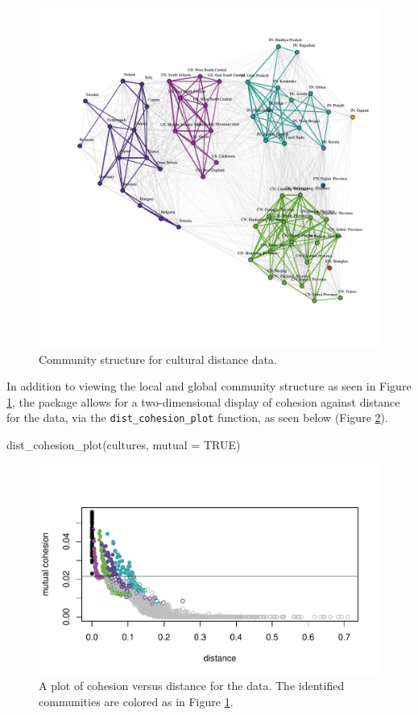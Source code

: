 \begin{Schunk}
\begin{figure}
\includegraphics[width=1\linewidth]{fig7} \caption[Community structure for cultural distance data]{Community structure for cultural distance data.}\label{fig:figculture}
\end{figure}
\end{Schunk}

In addition to viewing the local and global community structure as seen
in Figure \ref{fig:figculture}, the  package allows for a
two-dimensional display of cohesion against distance for the data, via
the \texttt{dist\_cohesion\_plot} function, as seen below (Figure
\ref{fig:figco}).

\begin{Schunk}
\begin{Sinput}
dist_cohesion_plot(cultures, mutual = TRUE)
\end{Sinput}
\begin{figure}
\includegraphics{dagostino-mcgowan_files/figure-latex/figco-1} \caption{A plot of cohesion versus distance for the data. The identified communities are colored as in Figure \ref{fig:figculture}.}\label{fig:figco}
\end{figure}
\end{Schunk}

